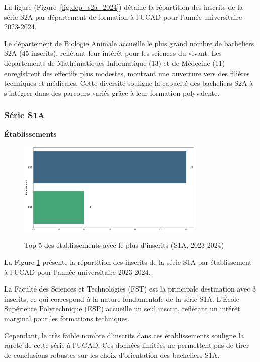 La figure (Figure~\ref{fig:dep_s2a_2024}) détaille la répartition des inscrits de la série S2A par département de formation à l'UCAD pour l'année universitaire 2023-2024.

Le département de Biologie Animale accueille le plus grand nombre de bacheliers S2A (45 inscrits), reflétant leur intérêt pour les sciences du vivant. 
Les départements de Mathématiques-Informatique (13) et de Médecine (11) enregistrent des effectifs plus modestes, montrant une ouverture vers des filières techniques et médicales. 
Cette diversité souligne la capacité des bacheliers S2A à s’intégrer dans des parcours variés grâce à leur formation polyvalente.

\subsubsection{Série S1A}

\textbf{Établissements}

\begin{figure}[ht]
\centering
\caption{Top 5 des établissements avec le plus d'inscrits (S1A, 2023-2024)}
\includegraphics[width=0.8\textwidth]{figure/etab_S1A_2024.png}
\label{fig:etab_s1a_2024}
\end{figure}

La Figure \ref{fig:etab_s1a_2024} présente la répartition des inscrits de la série S1A par établissement à l'UCAD pour l'année universitaire 2023-2024.

La Faculté des Sciences et Technologies (FST) est la principale destination avec 3 inscrits, ce qui correspond à la nature fondamentale de la série S1A. 
L’École Supérieure Polytechnique (ESP) accueille un seul inscrit, reflétant un intérêt marginal pour les formations techniques.

Cependant, le très faible nombre d’inscrits dans ces établissements souligne la rareté de cette série à l’UCAD. 
Ces données limitées ne permettent pas de tirer de conclusions robustes sur les choix d’orientation des bacheliers S1A.

